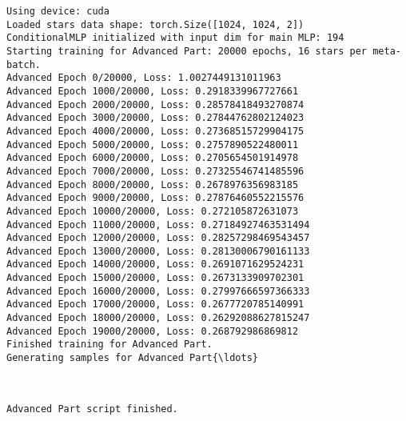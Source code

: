 \documentclass[11pt]{article}
\begin{document}
    \begin{Verbatim}[commandchars=\\\{\}]
Using device: cuda
Loaded stars data shape: torch.Size([1024, 1024, 2])
ConditionalMLP initialized with input dim for main MLP: 194
Starting training for Advanced Part: 20000 epochs, 16 stars per meta-batch.
Advanced Epoch 0/20000, Loss: 1.0027449131011963
Advanced Epoch 1000/20000, Loss: 0.2918339967727661
Advanced Epoch 2000/20000, Loss: 0.28578418493270874
Advanced Epoch 3000/20000, Loss: 0.27844762802124023
Advanced Epoch 4000/20000, Loss: 0.27368515729904175
Advanced Epoch 5000/20000, Loss: 0.2757890522480011
Advanced Epoch 6000/20000, Loss: 0.2705654501914978
Advanced Epoch 7000/20000, Loss: 0.27325546741485596
Advanced Epoch 8000/20000, Loss: 0.2678976356983185
Advanced Epoch 9000/20000, Loss: 0.27876460552215576
Advanced Epoch 10000/20000, Loss: 0.272105872631073
Advanced Epoch 11000/20000, Loss: 0.27184927463531494
Advanced Epoch 12000/20000, Loss: 0.28257298469543457
Advanced Epoch 13000/20000, Loss: 0.28130006790161133
Advanced Epoch 14000/20000, Loss: 0.2691071629524231
Advanced Epoch 15000/20000, Loss: 0.2673133909702301
Advanced Epoch 16000/20000, Loss: 0.27997666597366333
Advanced Epoch 17000/20000, Loss: 0.2677720785140991
Advanced Epoch 18000/20000, Loss: 0.26292088627815247
Advanced Epoch 19000/20000, Loss: 0.268792986869812
Finished training for Advanced Part.
Generating samples for Advanced Part{\ldots}
    \end{Verbatim}

    \begin{center}
    \end{center}
    { \hspace*{\fill} \\}
    
    \begin{Verbatim}[commandchars=\\\{\}]
Advanced Part script finished.
    \end{Verbatim}
\end{document}

